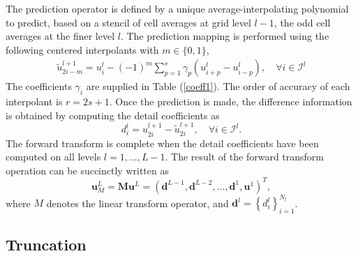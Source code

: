 \documentclass[]{article}
\begin{document}
    The prediction operator is defined by a unique average-interpolating
    polynomial to predict, based on a stencil of cell averages at grid level
    $l-1$, the odd cell averages at the finer level $l$. The prediction
    mapping is performed using the following centered interpolants with
    $m\in\{0,1\}$,
    \begin{align}
        \tilde{u}_{2i-m}^{l+1} = u_{i}^{l} - (-1)^{m} \sum_{p=1}^{s} \gamma_{p} \left(
            u^{l}_{i+p} - u^{l}_{i-p} \right), \quad \forall i \in \bm{\mathcal{I}}^{l}
        \label{prediction}
    \end{align}
    The coefficients $\gamma_{i}$ are supplied in Table (\ref{coeff1}). The
    order of accuracy of each interpolant is $r=2s+1$. Once the prediction is
    made, the difference information is obtained by computing the detail
    coefficients as
    \begin{equation}
        d^{l}_{i} = u^{l+1}_{2i} - \tilde{u}^{l+1}_{2i}, \quad \forall i \in \bm{\mathcal{I}}^{l}.
    \end{equation}
    The forward transform is complete when the detail coefficients have been
    computed on all levels $l=1,\dots,L-1$. The result of the forward
    transform operation can be succinctly written as
    \begin{equation}
        \bm{u}^{L}_{M} = \bm{M} \bm{u}^{L} = \left( \bm{d}^{L-1}, \bm{d}^{L-2},
        \dots, \bm{d}^{1}, \bm{u}^{1} \right)^{T},
    \end{equation}
    where $M$ denotes the linear transform operator, and $\bm{d}^{l} =
    \left\{d^{l}_{i}\right\}_{i=1}^{N_{l}}$.

    \subsection{Truncation}
\end{document}
